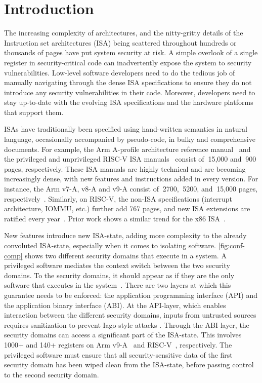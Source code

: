 \section{Introduction}
\label{sec:intro}
The increasing complexity of architectures, and the nitty-gritty details of the Instruction set architectures (ISA) being scattered throughout hundreds or thousands of pages have put system security at risk. 
A simple overlook of a single register in security-critical code can inadvertently expose the system to security vulnerabilities. 
Low-level software developers need to do the tedious job of manually navigating through the dense ISA specifications to ensure they do not introduce any security vulnerabilities in their code. 
Moreover, developers need to stay up-to-date with the evolving ISA specifications and the hardware platforms that support them.

ISAs have traditionally been specified using hand-written semantics in natural language, occasionally accompanied by pseudo-code, in bulky and comprehensive documents. 
For example, the Arm A-profile architecture reference manual~\cite{arm-ref-manual} and the privileged and unprivileged RISC-V ISA manuals~\cite{riscv-isa} consist of $~$15,000 and $~$900 pages, respectively. 
These ISA manuals are highly technical and are becoming increasingly dense, with new features and instructions added in every version. 
For instance, the Arm v7-A, v8-A and v9-A consist of $~$2700, $~$5200, and $~$15,000 pages, respectively~\cite{arm-v7-a, arm-v8-a, arm-ref-manual}. 
Similarly, on RISC-V, the non-ISA specifications (interrupt architecture, IOMMU, etc.) further add 767 pages\cite{riscv-specs}, and new ISA extensions are ratified every year~\cite{riscv-ratified}. 
Prior work shows a similar trend for the x86 ISA~\cite{hotos-baumann}. 



New features introduce new ISA-state, adding more complexity to the already convoluted ISA-state, especially when it comes to isolating software. \autoref{fig:conf-comp} shows two different security domains that execute in a system.
A privileged software mediates the context switch between the two security domains.
To the security domains, it should appear as if they are the only software that executes in the system~\cite{enclave-isolation, certikos}. 
There are two layers at which this guarantee needs to be enforced: the application programming interface (API) and the application binary interface (ABI). 
At the API-layer, which enables interaction between the different security domains, inputs from untrusted sources requires sanitization to prevent Iago-style attacks \cite{iago}. 
Through the ABI-layer, the security domains can access a significant part of the ISA-state. 
This involves 1000+ and 140+ registers on Arm v9-A~\cite{sail-arm} and RISC-V~\cite{sail-riscv}, respectively. 
The privileged software must ensure that all security-sensitive data of the first security domain has been wiped clean from the ISA-state, before passing control to the second security domain. 




